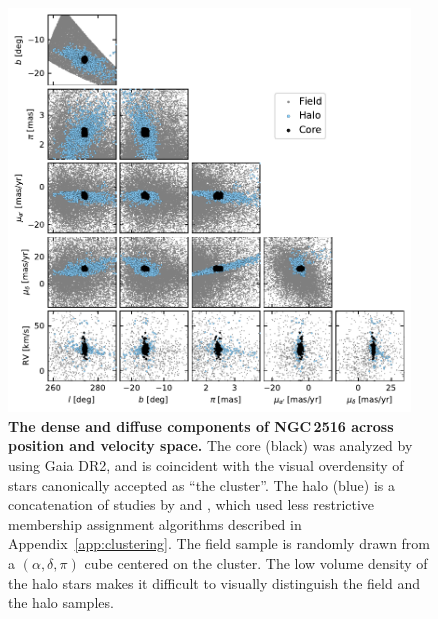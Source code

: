\documentclass[12pt,twocolumn,tighten]{aastex63}
\begin{document}
\begin{figure}[t]
	\begin{center}
		\leavevmode
		\includegraphics[width=0.95\textwidth]{f1.pdf}
	\end{center}
	\vspace{-0.7cm}
  \caption{ {\bf The dense and diffuse components of NGC\,2516 across
  position and velocity space.} The core (black) was analyzed by
  \citet{cantatgaudin_gaia_2018} using Gaia DR2, and is coincident
  with the visual overdensity of stars canonically accepted as ``the
  cluster''.  The halo (blue) is a concatenation of studies by
  \citet{kounkel_untangling_2019} and \citet{meingast_2021}, which
  used less restrictive membership assignment algorithms described in
  Appendix~\ref{app:clustering}.  The field sample is randomly drawn
  from a $(\alpha, \delta, \pi)$ cube centered on the cluster.  The
  low volume density of the halo stars makes it difficult to visually
  distinguish the field and the halo samples.
  \label{fig:gaia6d}
	}
\end{figure}
\end{document}
